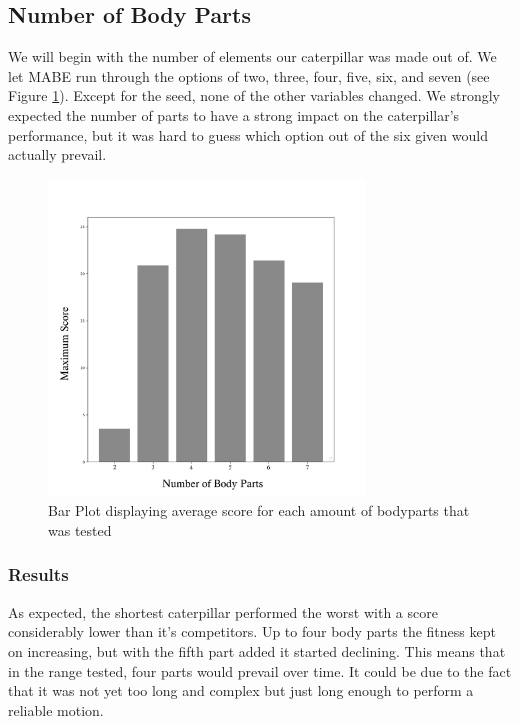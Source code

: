 \documentclass[12pt,oneside,listof=totoc,paper=a4,headings=small]{scrbook}
\begin{document}
\newpage

\subsection{Number of Body Parts}
We will begin with the number of elements our caterpillar was made out of. We let MABE run through the options of two, three, four, five, six, and seven (see Figure \ref{fig:parts_bars}). Except for the seed, none of the other variables changed. We strongly expected the number of parts to have a strong impact on the caterpillar's performance, but it was hard to guess which option out of the six given would actually prevail. 

\begin{figure}[h!]
\centering
\includegraphics[width=0.75\textwidth,height=0.75\textheight,keepaspectratio]{images/parts-bars.png}
\caption{Bar Plot displaying average score for each amount of bodyparts that was tested}
\label{fig:parts_bars}
\end{figure}


\subsubsection{Results}
As expected, the shortest caterpillar performed the worst with a score considerably lower than it's competitors. Up to four body parts the fitness kept on increasing, but with the fifth part added it started declining. This means that in the range tested, four parts would prevail over time. It could be due to the fact that it was not yet too long and complex but just long enough to perform a reliable motion.
\end{document}
